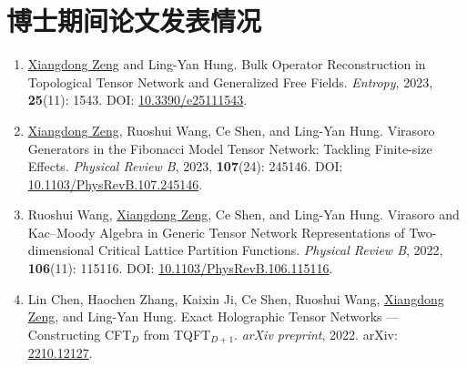 \chapter{博士期间论文发表情况}

\begin{enumerate}[leftmargin=1.2em]
  \item \underline{Xiangdong Zeng} and Ling-Yan Hung.
    Bulk Operator Reconstruction in Topological Tensor Network and Generalized Free Fields.
    \emph{Entropy}, 2023, \textbf{25}(11): 1543.
    DOI: \href{https://doi.org/10.3390/e25111543}{10.3390/e25111543}.
  \item \underline{Xiangdong Zeng}, Ruoshui Wang, Ce Shen, and Ling-Yan Hung.
    Virasoro Generators in the Fibonacci Model Tensor Network: Tackling Finite-size Effects.
    \emph{Physical Review B}, 2023, \textbf{107}(24): 245146.
    DOI: \href{https://doi.org/10.1103/PhysRevB.107.245146}{10.1103/PhysRevB.107.245146}.
  \item Ruoshui Wang, \underline{Xiangdong Zeng}, Ce Shen, and Ling-Yan Hung.
    Virasoro and Kac--Moody Algebra in Generic Tensor Network Representations of Two-dimensional Critical Lattice Partition Functions.
    \emph{Physical Review B}, 2022, \textbf{106}(11): 115116.
    DOI: \href{https://doi.org/10.1103/PhysRevB.106.115116}{10.1103/PhysRevB.106.115116}.
  \item Lin Chen, Haochen Zhang, Kaixin Ji, Ce Shen, Ruoshui Wang, \underline{Xiangdong Zeng}, and Ling-Yan Hung.
    Exact Holographic Tensor Networks --- Constructing CFT$_D$ from TQFT$_{D+1}$.
    \emph{arXiv preprint}, 2022. arXiv: \href{https://arxiv.org/abs/2210.12127}{2210.12127}.
\end{enumerate}
